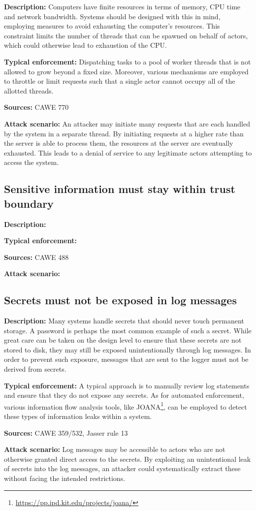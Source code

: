\textbf{Description:} Computers have finite resources in terms of memory, CPU time and network bandwidth. Systems should be designed with this in mind, employing measures to avoid exhausting the computer's resources. This constraint limits the number of threads that can be spawned on behalf of actors, which could otherwise lead to exhaustion of the CPU.
 
 \textbf{Typical enforcement:} Dispatching tasks to a pool of worker threads that is not allowed to grow beyond a fixed size. Moreover, various mechanisms are employed to throttle or limit requests such that a single actor cannot occupy all of the allotted threads.
 
 \textbf{Sources:} CAWE 770
 
 \textbf{Attack scenario:} An attacker may initiate many requests that are each handled by the system in a separate thread. By initiating requests at a higher rate than the server is able to process them, the resources at the server are eventually exhausted. This leads to a denial of service to any legitimate actors attempting to access the system.

\subsection{Sensitive information must stay within trust boundary}

\textbf{Description:} 
 
 \textbf{Typical enforcement:}
 
 \textbf{Sources:} CAWE 488
 
 \textbf{Attack scenario:}

\subsection{Secrets must not be exposed in log messages}

\textbf{Description:} Many systems handle secrets that should never touch permanent storage. A password is perhaps the most common example of such a secret. While great care can be taken on the design level to ensure that these secrets are not stored to disk, they may still be exposed unintentionally through log messages. In order to prevent such exposure, messages that are sent to the logger must not be derived from secrets.

 \textbf{Typical enforcement:} A typical approach is to manually review log statements and ensure that they do not expose any secrets. As for automated enforcement, various information flow analysis tools, like JOANA\footnote{\url{https://pp.ipd.kit.edu/projects/joana/}}, can be employed to detect these types of information leaks within a system.
 
 \textbf{Sources:} CAWE 359/532, Jasser rule 13
 
 \textbf{Attack scenario:} Log messages may be accessible to actors who are not otherwise granted direct access to the secrets. By exploiting an unintentional leak of secrets into the log messages, an attacker could systematically extract these without facing the intended restrictions.